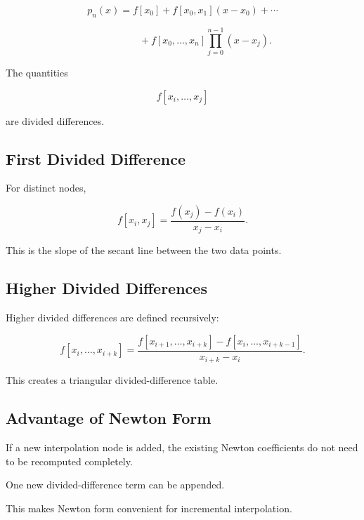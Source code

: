 \[
\boxed{
p_n(x)
=
f[x_0]
+
f[x_0,x_1]
(x-x_0)
+
\cdots
}
\]

\[
\boxed{
\phantom{p_n(x)={}}
+
f[x_0,\ldots,x_n]
\prod_{j=0}^{n-1}
(x-x_j).
}
\]

The quantities

\[
f[x_i,\ldots,x_j]
\]

are divided differences.

\subsection{First Divided Difference}
\label{subsec:first-divided-difference}

For distinct nodes,

\[
\boxed{
f[x_i,x_j]
=
\frac{
f(x_j)-f(x_i)
}{
x_j-x_i
}.
}
\]

This is the slope of the secant line between the two data points.

\subsection{Higher Divided Differences}
\label{subsec:higher-divided-differences}

Higher divided differences are defined recursively:

\[
\boxed{
f[x_i,\ldots,x_{i+k}]
=
\frac{
f[x_{i+1},\ldots,x_{i+k}]
-
f[x_i,\ldots,x_{i+k-1}]
}{
x_{i+k}-x_i
}.
}
\]

This creates a triangular divided-difference table.

\subsection{Advantage of Newton Form}
\label{subsec:newton-interpolation-advantage}

If a new interpolation node is added, the existing Newton coefficients do
not need to be recomputed completely.

One new divided-difference term can be appended.

This makes Newton form convenient for incremental interpolation.

